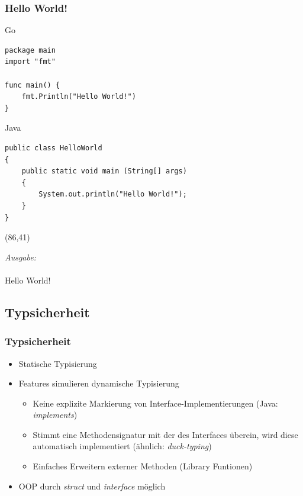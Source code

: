 \documentclass{beamer}
\begin{document}
\begin{frame}[fragile]
\frametitle{Hello World!}

Go
\begin{lstlisting}
package main
import "fmt"

func main() {
    fmt.Println("Hello World!")
}
\end{lstlisting}

Java
\lstset{language=Java}
\begin{lstlisting}
public class HelloWorld 
{ 
    public static void main (String[] args)
    {
        System.out.println("Hello World!");
    }
}
\end{lstlisting}

\begin{textblock}{32}(86,41)
\begin{tcolorbox}
\textit{Ausgabe:\\}\\
Hello World!
\end{tcolorbox}
\end{textblock}

\end{frame}


\subsection{Typsicherheit}
\begin{frame}
\frametitle{Typsicherheit}

\begin{itemize}
\setlength{\itemsep}{24pt}
\item Statische Typisierung
\item Features simulieren dynamische Typisierung
\begin{itemize}
\setlength{\itemsep}{12pt}
\item Keine explizite Markierung von Interface-Implementierungen (Java: \textit{implements})
\item Stimmt eine Methodensignatur mit der des Interfaces \"uberein, wird diese automatisch implementiert (\"ahnlich: \textit{duck-typing})
\item Einfaches Erweitern externer Methoden (Library Funtionen)
\end{itemize}
\item OOP durch \textit{struct} und \textit{interface} m\"oglich
\end{itemize}

\end{frame}
\end{document}
